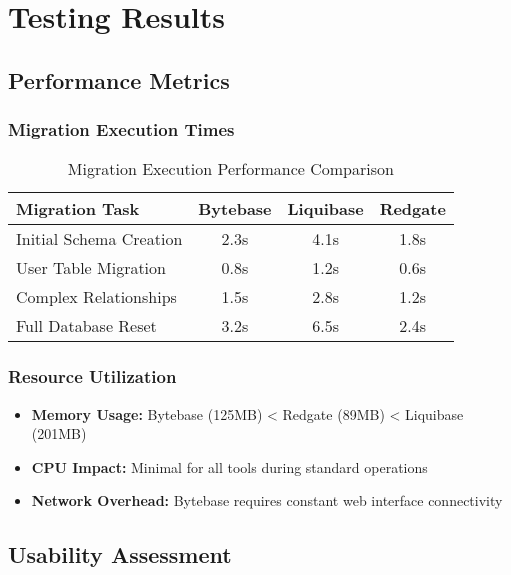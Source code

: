 \section{Testing Results}

\subsection{Performance Metrics}

\subsubsection{Migration Execution Times}
\begin{table}[H]
\centering
\begin{tabular}{|l|c|c|c|}
\hline
\textbf{Migration Task} & \textbf{Bytebase} & \textbf{Liquibase} & \textbf{Redgate} \\
\hline
Initial Schema Creation & 2.3s & 4.1s & 1.8s \\
\hline
User Table Migration & 0.8s & 1.2s & 0.6s \\
\hline
Complex Relationships & 1.5s & 2.8s & 1.2s \\
\hline
Full Database Reset & 3.2s & 6.5s & 2.4s \\
\hline
\end{tabular}
\caption{Migration Execution Performance Comparison}
\label{tab:performance}
\end{table}

\subsubsection{Resource Utilization}
\begin{itemize}
    \item \textbf{Memory Usage:} Bytebase (125MB) < Redgate (89MB) < Liquibase (201MB)
    \item \textbf{CPU Impact:} Minimal for all tools during standard operations
    \item \textbf{Network Overhead:} Bytebase requires constant web interface connectivity
\end{itemize}

\subsection{Usability Assessment}

